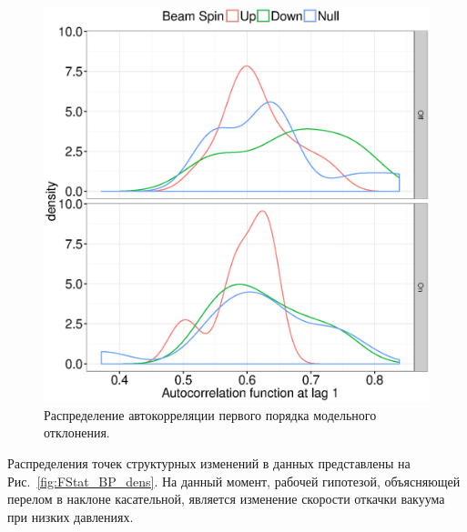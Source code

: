 \documentclass{article}
\begin{document}
	\begin{figure}[h]
		\centering
		\includegraphics[scale=.8]{img/ACF1_dens.eps}
		\caption{Распределение автокорреляции первого порядка модельного отклонения.\label{fig:DW2}}
	\end{figure}

	Распределения точек структурных изменений в данных представлены на Рис.~\ref{fig:FStat_BP_dens}. На данный момент, рабочей гипотезой, объясняющей перелом в наклоне касательной, является изменение скорости откачки вакуума при низких давлениях.
	
\end{document}
